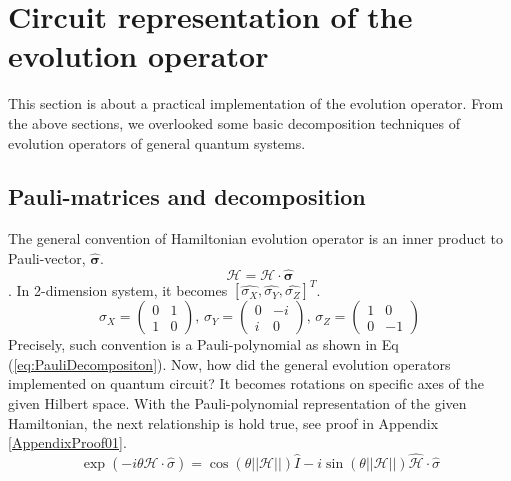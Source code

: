 \section{Circuit representation of the evolution operator}

This section is about a practical implementation of the evolution operator.
From the above sections, we overlooked some basic decomposition techniques of 
evolution operators of general quantum systems.

\subsection{Pauli-matrices and decomposition}

The general convention of Hamiltonian evolution operator is 
an inner product to Pauli-vector, $\mathbf{\hat{\sigma}}$.
\begin{equation}
    \mathcal{H} = \mathcal{H} \cdot \mathbf{\hat{\sigma}}
\end{equation}.
In 2-dimension system, it becomes $[\hat{\sigma_X}, \hat{\sigma_Y}, \hat{\sigma_Z}]^T$.
\begin{equation}
    \label{eq:pauli-matrix}
    \sigma_X = \begin{pmatrix}
        0 & 1\\
        1 & 0
    \end{pmatrix}, \,
    \sigma_Y = \begin{pmatrix}
        0 & -i\\
        i & 0
    \end{pmatrix}, \,
    \sigma_Z = \begin{pmatrix}
        1 & 0\\
        0 & -1
    \end{pmatrix}
\end{equation}
Precisely, such convention is a Pauli-polynomial as shown in Eq (\ref{eq:PauliDecompositon}).
Now, how did the general evolution operators implemented on quantum circuit?
It becomes rotations on specific axes of the given Hilbert space.
With the Pauli-polynomial representation of the given Hamiltonian,
the next relationship is hold true, see proof in Appendix \ref{AppendixProof01}.
\begin{equation}
    \label{eq:hamiltonain-exponential}
    \exp(-i \theta \mathcal{H} \cdot \hat{\sigma}) 
    = \cos(\theta ||\mathcal{H}||) \hat{I} - i \sin(\theta ||\mathcal{H}||) \hat{\mathcal{H}} \cdot \hat{\sigma}
\end{equation}

